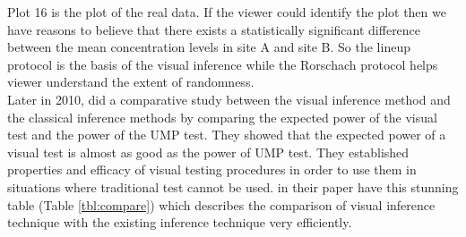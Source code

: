 Plot 16 is the plot of the real data. If the viewer could identify the plot then we have reasons to believe that there exists a statistically significant difference between the mean concentration levels in site A and site B. So the lineup protocol is the basis of the visual inference while the Rorschach protocol helps viewer understand the extent of randomness. \\

Later in 2010, \cite{majumder:2011} did a comparative study between the visual inference method and the classical inference methods by comparing the expected power of the visual test and the power of the UMP test. They showed that the expected power of a visual test is almost as good as the power of UMP test. They established properties and efficacy of visual testing procedures in order to use them in situations where traditional test cannot be used. \cite{majumder:2011} in their paper have this stunning table (Table \ref{tbl:compare}) which describes the comparison of visual inference technique with the existing inference technique very efficiently. 


